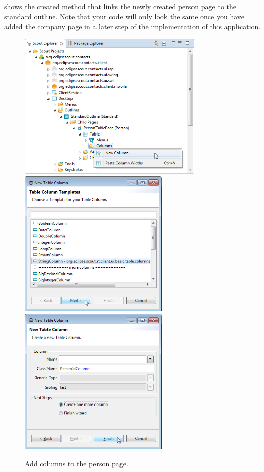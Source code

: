 \documentclass[a4paper,10pt,twoside]{book}
\begin{document}
 shows the created method  that links the newly created person page to the standard outline. 
Note that your code will only look the same once you have added the company page in a later step of the implementation of this application.

\begin{figure}
\includegraphics[height=7cm]{new_column_personid_contextmenu.png} \\
\vspace{2mm}
\includegraphics[height=7cm]{new_column_personid_1.png} \hspace{2mm}
\includegraphics[height=7cm]{new_column_personid_2.png}
\caption{Add columns to the person page.}
\end{figure}
\end{document}
